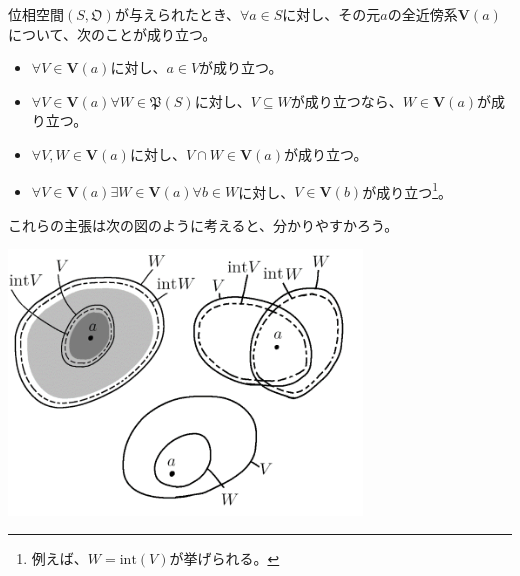 \documentclass[dvipdfmx]{jsarticle}
\begin{document}
\begin{thm}\label{8.1.1.24}
位相空間$\left( S,\mathfrak{O} \right)$が与えられたとき、$\forall a \in S$に対し、その元$a$の全近傍系$\mathbf{V}(a)$について、次のことが成り立つ。
\begin{itemize}
\item
  $\forall V \in \mathbf{V}(a)$に対し、$a \in V$が成り立つ。
\item
  $\forall V \in \mathbf{V}(a)\forall W \in \mathfrak{P}(S)$に対し、$V \subseteq W$が成り立つなら、$W \in \mathbf{V}(a)$が成り立つ。
\item
  $\forall V,W \in \mathbf{V}(a)$に対し、$V \cap W \in \mathbf{V}(a)$が成り立つ。
\item
  $\forall V \in \mathbf{V}(a)\exists W \in \mathbf{V}(a)\forall b \in W$に対し、$V \in \mathbf{V}(b)$が成り立つ\footnote{例えば、$W = {\mathrm{int}}(V)$が挙げられる。}。
\end{itemize}
\end{thm}
これらの主張は次の図のように考えると、分かりやすかろう。
\begin{center}
  \includegraphics[width=94mm]{8.1.1.k.png}
\end{center}
\end{document}
